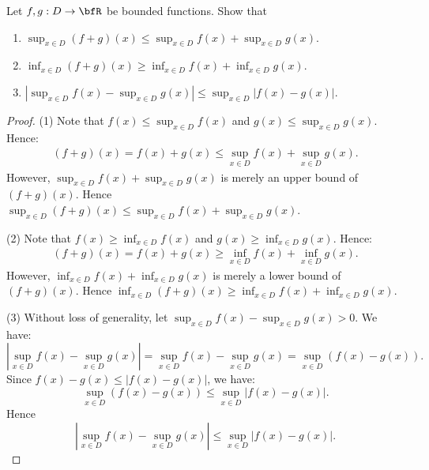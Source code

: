 \documentclass[10pt,twoside,openany]{memoir}
\begin{document}
    \begin{exercise}
        Let $f,g:D \rightarrow \bfR$ be bounded functions. Show that
            \begin{enumerate}[label = (\arabic*)]
                \item $\sup_{x\in D}(f+g)(x) \leq \sup_{x\in D}f(x) + \sup_{x\in D}g(x)$.
                \item $\inf_{x\in D}(f+g)(x) \geq \inf_{x\in D}f(x) + \inf_{x\in D}g(x)$.
                \item $\left|\sup_{x \in D}f(x) - \sup_{x \in D}g(x)\right| \leq \sup_{x\in D}\left|f(x) - g(x)\right|$.
            \end{enumerate}
    \end{exercise}
        \begin{proof}
            (1) Note that $f(x) \leq \sup_{x \in D}f(x)$ and $g(x) \leq \sup_{x \in D}g(x)$. Hence:
                \begin{equation*}
                \begin{split}
                    (f+g)(x) = f(x) + g(x) \leq \sup_{x \in D}f(x) + \sup_{x \in D}g(x).
                \end{split}
                \end{equation*}
            However, $\sup_{x \in D}f(x) + \sup_{x \in D}g(x)$ is merely an upper bound of $(f+g)(x)$. Hence $\sup_{x \in D}(f+g)(x) \leq \sup_{x \in D}f(x) + \sup_{x \in D}g(x)$.

            (2) Note that $f(x) \geq \inf_{x \in D}f(x)$ and $g(x) \geq \inf_{x \in D}g(x)$. Hence:
                \begin{equation*}
                \begin{split}
                    (f+g)(x) = f(x) + g(x) \geq \inf_{x \in D}f(x) + \inf_{x \in D}g(x).
                \end{split}
                \end{equation*}
             However, $\inf_{x \in D}f(x) + \inf_{x \in D}g(x)$ is merely a lower bound of $(f+g)(x)$. Hence $\inf_{x \in D}(f+g)(x) \geq \inf_{x \in D}f(x) + \inf_{x \in D}g(x)$.

             (3) Without loss of generality, let $\sup_{x \in D}f(x) - \sup_{x \in D}g(x) > 0$. We have: $$\left|\sup_{x \in D}f(x) - \sup_{x \in D}g(x)\right| = \sup_{x \in D}f(x) - \sup_{x \in D}g(x) = \sup_{x \in D}\left(f(x) - g(x)\right).$$ Since $f(x) - g(x) \leq |f(x) - g(x)|$, we have: $$\sup_{x \in D}\left(f(x) - g(x)\right) \leq \sup_{x \in D}\left|f(x) - g(x)\right|.$$ Hence $$\left|\sup_{x \in D}f(x) - \sup_{x \in D}g(x)\right| \leq \sup_{x\in D}\left|f(x) - g(x)\right|.$$
        \end{proof}
\end{document}
